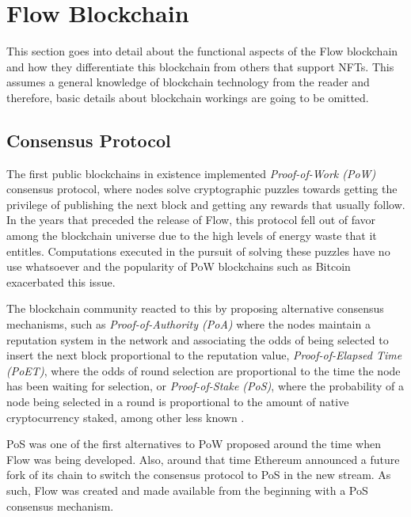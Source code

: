 \documentclass[../NFTComp_IEEE.tex]{subfiles}
\begin{document}
\section{Flow Blockchain}
\label{sec:flow_blockchain}
This section goes into detail about the functional aspects of the Flow blockchain and how they differentiate this blockchain from others that support NFTs. This assumes a general knowledge of blockchain technology from the reader and therefore, basic details about blockchain workings are going to be omitted.
\par
\subsection{Consensus Protocol}
The first public blockchains in existence implemented \textit{Proof-of-Work (PoW)} consensus protocol, where nodes solve cryptographic puzzles towards getting the privilege of publishing the next block and getting any rewards that usually follow. In the years that preceded the release of Flow, this protocol fell out of favor among the blockchain universe due to the high levels of energy waste that it entitles. Computations executed in the pursuit of solving these puzzles have no use whatsoever and the popularity of PoW blockchains such as Bitcoin exacerbated this issue.
\par
The blockchain community reacted to this by proposing alternative consensus mechanisms, such as \textit{Proof-of-Authority (PoA)} where the nodes maintain a reputation system in the network and associating the odds of being selected to insert the next block proportional to the reputation value, \textit{Proof-of-Elapsed Time (PoET)}, where the odds of round selection are proportional to the time the node has been waiting for selection, or \textit{Proof-of-Stake (PoS)}, where the probability of a node being selected in a round is proportional to the amount of native cryptocurrency staked, among other less known \cite{Bouraga2021}.
\par
PoS was one of the first alternatives to PoW proposed around the time when Flow was being developed. Also, around that time Ethereum announced a future fork of its chain to switch the consensus protocol to PoS in the new stream. As such, Flow was created and made available from the beginning with a PoS consensus mechanism.
\end{document}
